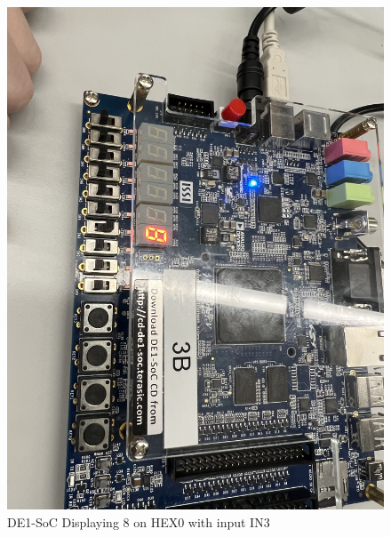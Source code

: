 \documentclass[
	letterpaper, %
	10pt, %
]{CSUniSchoolLabReport}
\begin{document}
\begin{figure}[H]
  \centering
  \includegraphics[width=.9\textwidth]{Figures/Disp_8.jpg}
  \caption{DE1-SoC Displaying 8 on HEX0 with input IN3}
  \label{fig:11}
\end{figure}
\end{document}
